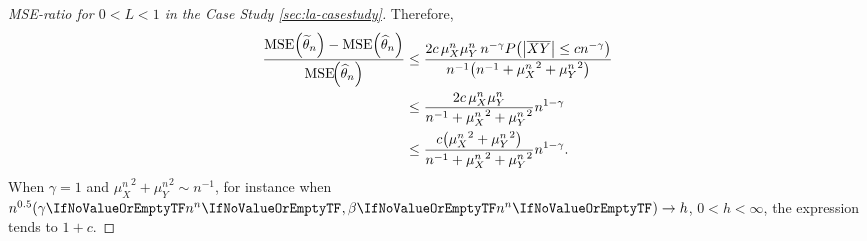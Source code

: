 \documentclass[ejs, twoside]{imsart}
\theoremstyle{plain}
\theoremstyle{remark}
\numberwithin{equation}{section}
\numberwithin{table}{section}
\numberwithin{figure}{section}
\let\originalleft\left
\let\originalright\right
\renewcommand{\left}{\mathopen{}\mathclose\bgroup\originalleft}
\renewcommand{\right}{\aftergroup\egroup\originalright}
\begin{document}
\begin{appendix}
\begin{proof}[MSE-ratio for \(0<L<1\) in the Case Study \ref{sec:la-casestudy}]
	Therefore,
	\begin{align*}
		\frac{\operatorname{MSE}\!{\left( \widetilde{\theta}_n\right) } -\operatorname{MSE}\!{\left(
				\widehat{\theta}_n\right) }}
		{\operatorname{MSE}\!\left( \widehat{\theta}_n \right)}
		&\le \frac
		{2c\,\mu_X^n \mu_Y^n \, n^{-\gamma} P\left( \left| \avg{X}\avg{Y} \right| \le cn^{-\gamma} \right)}
		{n^{-1} \left( n^{-1} + {\mu_X^n}^2 + {\mu_Y^n}^2 \right)} \\
		&\le \frac{2c\,\mu_X^n\mu_Y^n} {n^{-1}+{\mu_X^n}^2+{\mu_Y^n}^2} n^{1-\gamma} \\
		&\le \frac{ c\left( {\mu_X^n}^2 + {\mu_Y^n}^2\right) } {n^{-1}+{\mu_X^n}^2+{\mu_Y^n}^2} n^{1-\gamma}
		.
	\end{align*}
	When \(\gamma = 1\) and ${\mu_X^n}^2 + {\mu_Y^n}^2 \sim n^{-1}$, for instance when \(n^{0.5}\left(\regcoef{1}[n], \regcoef{2}[n] \right) \to h \), \(0<h<\infty\), the expression tends to \(1+c\).
	

\end{proof}
\end{appendix}

	
	
\end{document}
